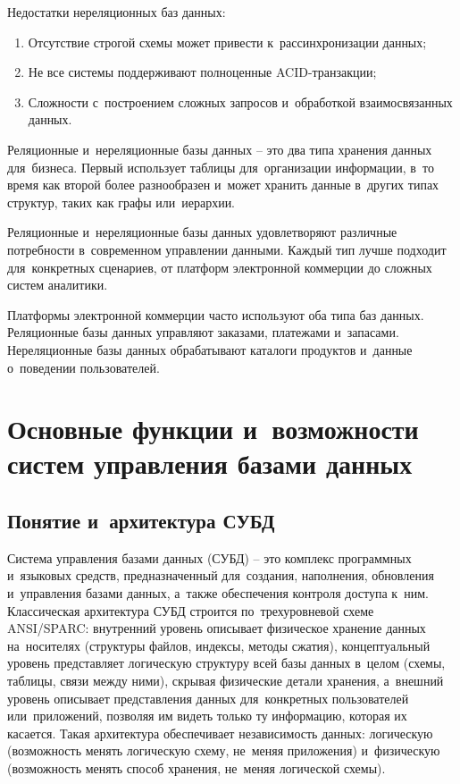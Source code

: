 \documentclass{ou}
\begin{document}
Недостатки нереляционных баз данных:
\begin{enumerate}[leftmargin=0em, itemindent=3.75em, nosep, label=\arabic*)]
\item Отсутствие строгой схемы может привести к~рассинхронизации данных;
\item Не все системы поддерживают полноценные ACID-транзакции;
\item Сложности с~построением сложных запросов и~обработкой взаимосвязанных данных.
\end{enumerate}

Реляционные и~нереляционные базы данных -- это два типа хранения данных для~бизнеса. Первый использует таблицы для~организации информации, в~то время как второй более разнообразен и~может хранить данные в~других типах структур, таких как графы или~иерархии.

Реляционные и~нереляционные базы данных удовлетворяют различные потребности в~современном управлении данными. Каждый тип лучше подходит для~конкретных сценариев, от платформ электронной коммерции до сложных систем аналитики.

Платформы электронной коммерции часто используют оба типа баз данных. Реляционные базы данных управляют заказами, платежами и~запасами. Нереляционные базы данных обрабатывают каталоги продуктов и~данные о~поведении пользователей.
\newpage
\section{Основные функции и~возможности систем управления базами данных}
\subsection{Понятие и~архитектура СУБД}
Система управления базами данных (СУБД) -- это комплекс программных и~языковых средств, предназначенный для~создания, наполнения, обновления и~управления базами данных, а~также обеспечения контроля доступа к~ним. Классическая архитектура СУБД строится по~трехуровневой схеме ANSI/SPARC: внутренний уровень описывает физическое хранение данных на~носителях (структуры файлов, индексы, методы сжатия), концептуальный уровень представляет логическую структуру всей базы данных в~целом (схемы, таблицы, связи между ними), скрывая физические детали хранения, а~внешний уровень описывает представления данных для~конкретных пользователей или~приложений, позволяя им видеть только ту информацию, которая их касается. Такая архитектура обеспечивает независимость данных: логическую (возможность менять логическую схему, не~меняя приложения) и~физическую (возможность менять способ хранения, не~меняя логической схемы).
\end{document}
